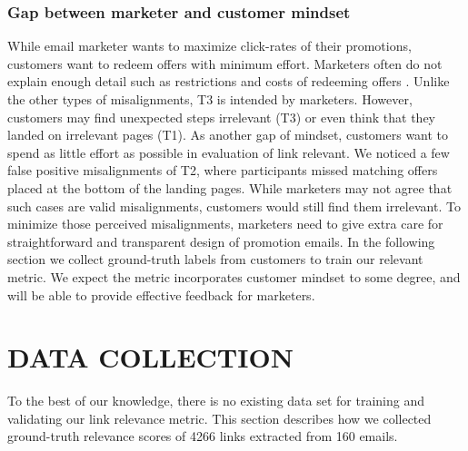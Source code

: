 \documentclass{sigchi}
\begin{document}
\subsubsection{Gap between marketer and customer mindset}
While email marketer wants to maximize click-rates of their promotions, customers want to redeem offers with minimum effort. Marketers often do not explain enough detail such as restrictions and costs of redeeming offers . Unlike the other types of misalignments, T3 is intended by marketers. However, customers may find unexpected steps irrelevant (T3) or even think that they landed on irrelevant pages (T1). As another gap of mindset, customers want to spend as little effort as possible in evaluation of link relevant. We noticed a few false positive misalignments of T2, where participants missed matching offers placed at the bottom of the landing pages. While marketers may not agree that such cases are valid misalignments, customers would still find them irrelevant. To minimize those perceived misalignments, marketers need to give extra care for straightforward and transparent design of promotion emails. In the following section we collect ground-truth labels from customers to train our relevant metric. We expect the metric incorporates customer mindset to some degree, and will be able to provide effective feedback for marketers.    



\section{DATA COLLECTION}
To the best of our knowledge, there is no existing data set for training and validating our link relevance metric. This section describes how we collected ground-truth relevance scores of 4266 links extracted from 160 emails.  
\end{document}
